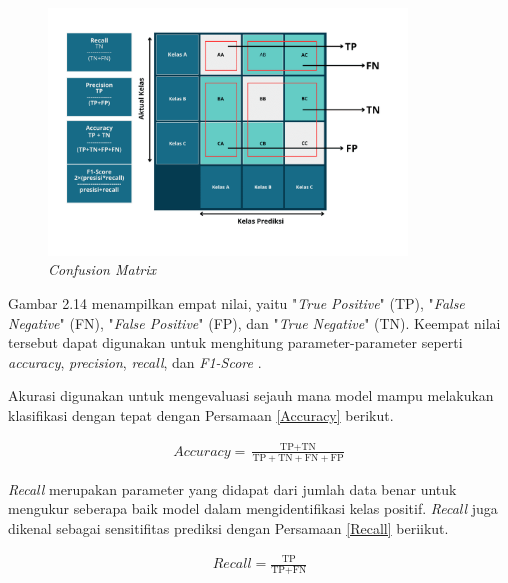     \begin{figure}[H]
      \centering
      \includegraphics[width=0.85\textwidth]{figures/bab2/confusion matriks.png}
      \caption{\textit{Confusion Matrix}}
      \label{Confusion Matrix}
    
    \end{figure}

    Gambar 2.14 menampilkan empat nilai, yaitu "\textit{True Positive}" (TP), "\textit{False Negative}" (FN), "\textit{False Positive}" (FP), dan "\textit{True Negative}" (TN). Keempat nilai tersebut dapat digunakan untuk menghitung parameter-parameter seperti \textit{accuracy}, \textit{precision}, \textit{recall}, dan \textit{F1-Score} \cite{Nurhikmat2018}.

     Akurasi digunakan untuk mengevaluasi sejauh mana model mampu melakukan klasifikasi dengan tepat dengan Persamaan \ref{Accuracy} berikut. 
     
    \begin{equation}
        \begin{aligned}
            \textit{Accuracy} = \frac{\text{TP} + \text{TN}}{\text{TP} + \text{TN} + \text{FN} + \text{FP}}
        \end{aligned}\label{Accuracy}
    \end{equation}


    \textit{Recall} merupakan parameter yang didapat dari jumlah data benar untuk mengukur seberapa baik model dalam mengidentifikasi kelas positif. \textit{Recall} juga dikenal sebagai sensitifitas prediksi dengan Persamaan \ref{Recall} beriikut.

    
    \begin{equation} 
        \begin{aligned}
            \textit{Recall} = \frac{\text{TP}}{\text{TP} + \text{FN}} 
        \end{aligned}\label{Recall}
    \end{equation}

